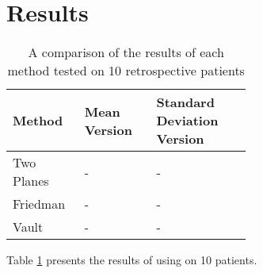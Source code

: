 \section{Results}
\label{sec:results}
\begin{table}
	\begin{center}
		\begin{tabular}{|p{0.3\linewidth}|p{0.3\linewidth}|p{}|} \hline
			Method & Mean Version & Standard Deviation Version \\ \hline
			Two Planes & - & - \\
			Friedman & - & - \\
			Vault & - & - \\
                        \hline
		\end{tabular}
	\end{center}
	\caption{\label{tab:results}A comparison of the results of each method tested 
	on 10 retrospective patients}
\end{table}

Table \ref{tab:results} presents the results of using \sksglenoid on 10 patients.
